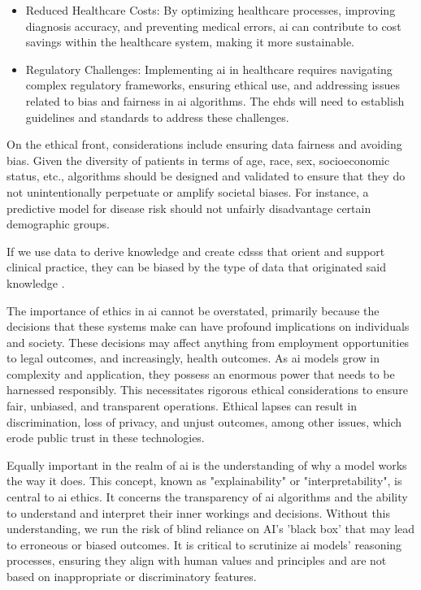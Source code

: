 \begin{itemize}
\item Reduced Healthcare Costs: By optimizing healthcare processes, improving diagnosis accuracy, and preventing medical errors, \ac{ai} can contribute to cost savings within the healthcare system, making it more sustainable.

\item Regulatory Challenges: Implementing \ac{ai} in healthcare requires navigating complex regulatory frameworks, ensuring ethical use, and addressing issues related to bias and fairness in \ac{ai} algorithms. The \ac{ehds} will need to establish guidelines and standards to address these challenges.

\end{itemize}


On the ethical front, considerations include ensuring data fairness and avoiding bias. Given the diversity of patients in terms of age, race, sex, socioeconomic status, etc., algorithms should be designed and validated to ensure that they do not unintentionally perpetuate or amplify societal biases. For instance, a predictive model for disease risk should not unfairly disadvantage certain demographic groups.

If we use data to derive knowledge and create \acp{cdss} that orient and support clinical practice, they can be biased by the type of data that originated said knowledge \cite{EthicsGuidelinesTrustworthy2019,barocas-hardt-narayanan}.


The importance of ethics in \ac{ai} cannot be overstated, primarily because the decisions that these systems make can have profound implications on individuals and society. These decisions may affect anything from employment opportunities to legal outcomes, and increasingly, health outcomes. As \ac{ai} models grow in complexity and application, they possess an enormous power that needs to be harnessed responsibly. This necessitates rigorous ethical considerations to ensure fair, unbiased, and transparent operations. Ethical lapses can result in discrimination, loss of privacy, and unjust outcomes, among other issues, which erode public trust in these technologies.

Equally important in the realm of \ac{ai} is the understanding of why a model works the way it does. This concept, known as "explainability" or "interpretability", is central to \ac{ai} ethics. It concerns the transparency of \ac{ai} algorithms and the ability to understand and interpret their inner workings and decisions. Without this understanding, we run the risk of blind reliance on AI's 'black box' that may lead to erroneous or biased outcomes. It is critical to scrutinize \ac{ai} models' reasoning processes, ensuring they align with human values and principles and are not based on inappropriate or discriminatory features.

